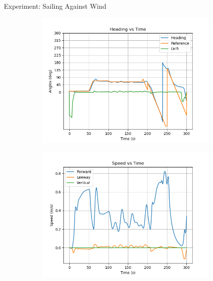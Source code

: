 \documentclass[10pt,xcolor={table,dvipsnames},t]{beamer}
\begin{document}
\begin{frame}{Experiment: Sailing Against Wind}
    \begin{figure}
     \centering
     \begin{subfigure}[b]{0.33\textwidth}
         \centering
         \includegraphics[width=\textwidth,trim={0.5cm 0.25cm 1.25cm 0.75cm },clip]{documents/final_pres_figs/against_wind_to_40_40_heading.png}
         \label{fig:right_wind_heading}
     \end{subfigure}
     \begin{subfigure}[b]{0.33\textwidth}
         \centering
         \includegraphics[width=\textwidth,trim={0.5cm 0.25cm 1.25cm 0.75cm },clip]{documents/final_pres_figs/against_wind_to_40_40_speed.png}

\end{subfigure}
\end{figure}
\end{frame}
\end{document}
